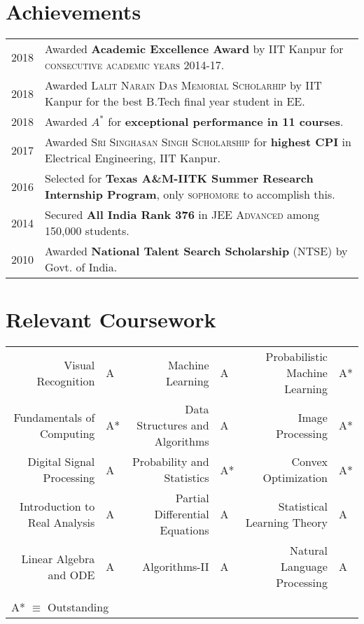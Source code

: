 \documentclass[a4paper,10pt]{article}
\begin{document}
\section{Achievements}
\begin{tabular}{rl}
2018 & Awarded \textbf{Academic Excellence Award} by IIT Kanpur for \textsc{consecutive academic years 2014-17}.\\
2018 & Awarded \textsc{Lalit Narain Das Memorial Scholarhip} by IIT Kanpur for the best B.Tech final year student in EE.\\
2018 & Awarded $A^*$ for \textbf{exceptional performance in 11 courses}.\\
2017 & Awarded \textsc{Sri Singhasan Singh Scholarship} for \textbf{highest CPI} in Electrical Engineering, IIT Kanpur.\\
2016 & Selected for \textbf{Texas A\&M-IITK Summer Research Internship Program}, only \textsc{sophomore} to accomplish this.\\
2014 & Secured \textbf{All India Rank 376} in \textsc{JEE Advanced} among 150,000 students.\\
2010 & Awarded \textbf{National Talent Search Scholarship} (NTSE) by Govt. of India.

\end{tabular}
\section{Relevant Coursework}
\centering
\begin{tabular}{rl|rl|rl}
Visual Recognition & A & Machine Learning & A & Probabilistic Machine Learning & A*\\
Fundamentals of Computing & A* & Data Structures and Algorithms & A & Image Processing & A*\\
Digital Signal Processing & A & Probability and Statistics & A* & Convex Optimization & A*\\
Introduction to Real Analysis & A & Partial Differential Equations & A & Statistical Learning Theory & A\\
Linear Algebra and ODE & A & Algorithms-II & A & Natural Language Processing & A\\ \\

\multicolumn{4}{l}{\footnotesize A* $\equiv$ Outstanding}\\
\end{tabular}
\end{document}
